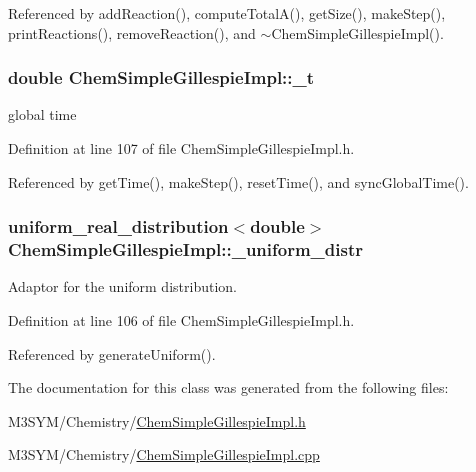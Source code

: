 Referenced by add\+Reaction(), compute\+Total\+A(), get\+Size(), make\+Step(), print\+Reactions(), remove\+Reaction(), and $\sim$\+Chem\+Simple\+Gillespie\+Impl().

\hypertarget{classChemSimpleGillespieImpl_a3ecc9f9f89d6fe3f543ee71a5a619974}{
\subsubsection[{\+\_\+t}]{\setlength{\rightskip}{0pt plus 5cm}double Chem\+Simple\+Gillespie\+Impl\+::\+\_\+t\hspace{0.3cm}{\ttfamily [private]}}}\label{classChemSimpleGillespieImpl_a3ecc9f9f89d6fe3f543ee71a5a619974}


global time 



Definition at line 107 of file Chem\+Simple\+Gillespie\+Impl.\+h.



Referenced by get\+Time(), make\+Step(), reset\+Time(), and sync\+Global\+Time().

\hypertarget{classChemSimpleGillespieImpl_a7dcca7be34a807bc6e9fbc7002207456}{
\subsubsection[{\+\_\+uniform\+\_\+distr}]{\setlength{\rightskip}{0pt plus 5cm}uniform\+\_\+real\+\_\+distribution$<$double$>$ Chem\+Simple\+Gillespie\+Impl\+::\+\_\+uniform\+\_\+distr\hspace{0.3cm}{\ttfamily [private]}}}\label{classChemSimpleGillespieImpl_a7dcca7be34a807bc6e9fbc7002207456}


Adaptor for the uniform distribution. 



Definition at line 106 of file Chem\+Simple\+Gillespie\+Impl.\+h.



Referenced by generate\+Uniform().



The documentation for this class was generated from the following files\+:\begin{DoxyCompactItemize}
\item 
M3\+S\+Y\+M/\+Chemistry/\hyperlink{ChemSimpleGillespieImpl_8h}{Chem\+Simple\+Gillespie\+Impl.\+h}\item 
M3\+S\+Y\+M/\+Chemistry/\hyperlink{ChemSimpleGillespieImpl_8cpp}{Chem\+Simple\+Gillespie\+Impl.\+cpp}\end{DoxyCompactItemize}
